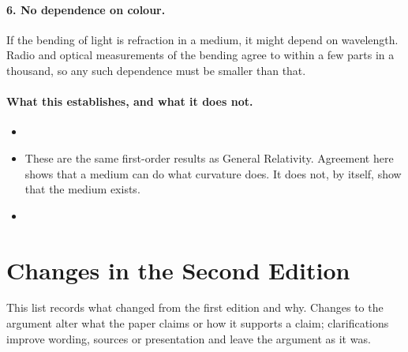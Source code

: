 \paragraph{6. No dependence on colour.} If the bending of light is refraction in a medium, it might depend on wavelength. Radio and optical measurements of the bending agree to within a few parts in a thousand, so any such dependence must be smaller than that. 

\paragraph{What this establishes, and what it does not.}
\begin{itemize}
  \item {}
  \item These are the same first-order results as General Relativity. Agreement here shows that a medium can do what curvature does. It does not, by itself, show that the medium exists.
  \item {}
\end{itemize}

\clearpage
\section*{Changes in the Second Edition}

This list records what changed from the first edition and why. Changes to the argument alter what the paper claims or how it supports a claim; clarifications improve wording, sources or presentation and leave the argument as it was.

